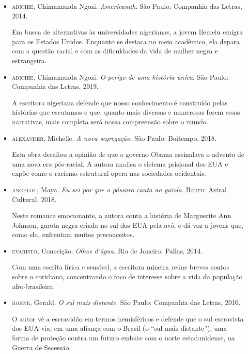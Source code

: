 \documentclass[12pt]{extarticle}
\begin{document}
\begin{itemize}
\item
\textsc{adichie}, Chimamanda Ngozi. \textit{Americanah}. São Paulo: Companhia
das Letras, 2014.

Em busca de alternativas às universidades nigerianas, a jovem Ifemelu
emigra para os Estados Unidos. Enquanto se destaca no meio acadêmico,
ela depara com a questão racial e com as dificuldades da vida de mulher
negra e estrangeira.

\item
\textsc{adichie}, Chimamanda Ngozi. \textit{O perigo de uma história única}.
São Paulo: Companhia das Letras, 2019.

A escritora nigeriana defende que nosso conhecimento é construído pelas
histórias que escutamos e que, quanto mais diversas e numerosas forem
essas narrativas, mais completa será nossa compreensão sobre o mundo.

\item
\textsc{alexander}, Michelle. \textit{A nova segregação}. São Paulo: Boitempo,
2018.

Esta obra desafiou a opinião de que o governo Obama assinalava o advento
de uma nova era pós-racial. A autora analisa o sistema prisional dos EUA
e expõe como o racismo estrutural opera nas sociedades ocidentais.


\item
\textsc{angelou}, Maya. \textit{Eu sei por que o pássaro canta na gaiola}.
Bauru: Astral Cultural, 2018.

Neste romance emocionante, a autora conta a história de Marguerite Ann
Johnson, garota negra criada no sul dos EUA pela avó, e dá voz a jovens
que, como ela, enfrentam muitos preconceitos.

\item
\textsc{evaristo}, Conceição. \textit{Olhos d'água}. Rio de Janeiro: Pallas,
2014.

Com uma escrita lírica e sensível, a escritora mineira reúne breves
contos sobre o cotidiano, concentrando o foco de interesse sobre a vida
da população afro-brasileira.

\item
\textsc{horne}, Gerald. \textit{O sul mais distante}. São Paulo: Companhia das
  Letras, 2010.

O autor vê a escravidão em termos hemisféricos e defende que o sul
escravista dos EUA via, em uma aliança com o Brasil (o ``sul mais
distante''), uma forma de proteção contra um futuro embate com o norte
estadunidense, na Guerra de Secessão.


\end{itemize}
\end{document}
